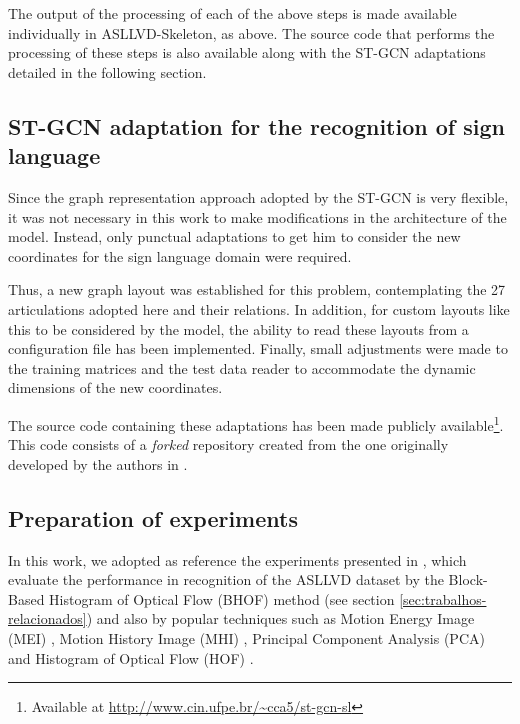 The output of the processing of each of the above steps is made available individually in ASLLVD-Skeleton, as above. The source code that performs the processing of these steps is also available along with the ST-GCN adaptations detailed in the following section.


\subsection{ST-GCN adaptation for the recognition of sign language} 
\label{sec:adaptacao-st-gcn}

Since the graph representation approach adopted by the ST-GCN is very flexible, it was not necessary in this work to make modifications in the architecture of the model. Instead, only punctual adaptations to get him to consider the new coordinates for the sign language domain were required.

Thus, a new graph layout was established for this problem, contemplating the 27 articulations adopted here and their relations. In addition, for custom layouts like this to be considered by the model, the ability to read these layouts from a configuration file has been implemented. Finally, small adjustments were made to the training matrices and the test data reader to accommodate the dynamic dimensions of the new coordinates.

The source code containing these adaptations has been made publicly available\footnote{
    Available at \url{http://www.cin.ufpe.br/~cca5/st-gcn-sl}
}. This code consists of a \textit{forked} repository created from the one originally developed by the authors in \cite{st-gcn-2018}.


\subsection{Preparation of experiments} 
\label{experimentos}

In this work, we adopted as reference the experiments presented in \cite{lim-2016}, which evaluate the performance in recognition of the ASLLVD dataset by the Block-Based Histogram of Optical Flow (BHOF) method (see section \ref{sec:trabalhos-relacionados}) and also by popular techniques such as Motion Energy Image (MEI) \cite{athitsos-asllvd-2008}, Motion History Image (MHI) \cite{babu-2004}, Principal Component Analysis (PCA) \cite{dreuw-2012} and Histogram of Optical Flow (HOF) \cite{laptev-2008}.

